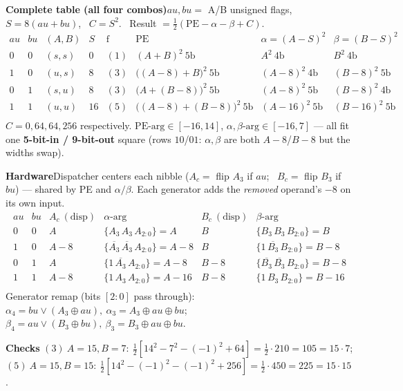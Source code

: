 \documentclass[fleqn]{article}
\begin{document}
\textbf{Complete table (all four combos)}\quad $au,bu=$ A/B unsigned flags, \ $S=8(au{+}bu)$, \ $C=S^2$. \ Result $=\tfrac12(\mathrm{PE}-\alpha-\beta+C)$.
\[
\renewcommand{\arraystretch}{1.3}
\begin{array}{cc|c|c|c|c|c|c}
au & bu & (A,B) & S & \text{f} & \mathrm{PE} & \alpha=(A{-}S)^2 & \beta=(B{-}S)^2 \\ \hline
0&0 & (s,s) & 0 & (1) & (A{+}B)^2\ \text{5b} & A^2\ \text{4b} & B^2\ \text{4b} \\
1&0 & (u,s) & 8 & (3) & \big((A{-}8){+}B\big)^2\ \text{5b} & (A{-}8)^2\ \text{4b} & (B{-}8)^2\ \text{5b} \\
0&1 & (s,u) & 8 & (3) & \big(A{+}(B{-}8)\big)^2\ \text{5b} & (A{-}8)^2\ \text{5b} & (B{-}8)^2\ \text{4b} \\
1&1 & (u,u) & 16 & (5) & \big((A{-}8){+}(B{-}8)\big)^2\ \text{5b} & (A{-}16)^2\ \text{5b} & (B{-}16)^2\ \text{5b} \\
\end{array}
\]
$C=0,64,64,256$ respectively. $\mathrm{PE}\text{-arg}\in[-16,14]$, $\alpha,\beta\text{-arg}\in[-16,7]$ --- all fit one \textbf{5-bit-in / 9-bit-out} square (rows $10$/$01$: $\alpha,\beta$ are both $A{-}8$/$B{-}8$ but the widths swap).

\vspace{0.5em}

\textbf{Hardware}\quad Dispatcher centers each nibble ($A_c=$ flip $A_3$ if $au$; \ $B_c=$ flip $B_3$ if $bu$) --- shared by PE and $\alpha/\beta$. Each generator adds the \emph{removed} operand's $-8$ on its own input.
\[
\renewcommand{\arraystretch}{1.3}
\begin{array}{cc|c|c|c|c}
au & bu & A_c\ (\text{disp}) & \alpha\text{-arg} & B_c\ (\text{disp}) & \beta\text{-arg} \\ \hline
0&0 & A & \{A_3\,A_3\,A_{2:0}\}{=}A & B & \{B_3\,B_3\,B_{2:0}\}{=}B \\
1&0 & A{-}8 & \{\overline{A_3}\,\overline{A_3}\,A_{2:0}\}{=}A{-}8 & B & \{1\,\overline{B_3}\,B_{2:0}\}{=}B{-}8 \\
0&1 & A & \{1\,\overline{A_3}\,A_{2:0}\}{=}A{-}8 & B{-}8 & \{\overline{B_3}\,\overline{B_3}\,B_{2:0}\}{=}B{-}8 \\
1&1 & A{-}8 & \{1\,A_3\,A_{2:0}\}{=}A{-}16 & B{-}8 & \{1\,B_3\,B_{2:0}\}{=}B{-}16 \\
\end{array}
\]
Generator remap (bits $[2{:}0]$ pass through): $\alpha_4{=}bu\vee(A_3{\oplus}au),\ \alpha_3{=}A_3{\oplus}au{\oplus}bu$;\ \ $\beta_4{=}au\vee(B_3{\oplus}bu),\ \beta_3{=}B_3{\oplus}au{\oplus}bu$.

\vspace{0.4em}

\textbf{Checks}\quad
$(3)\ A{=}15,B{=}7:\ \tfrac12[14^2-7^2-(-1)^2+64]=\tfrac12\cdot210=105=15\cdot7$;\quad
$(5)\ A{=}15,B{=}15:\ \tfrac12[14^2-(-1)^2-(-1)^2+256]=\tfrac12\cdot450=225=15\cdot15$.
\end{document}
